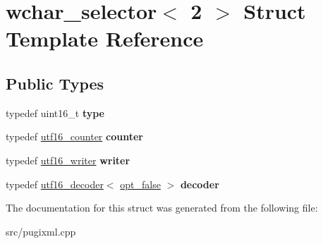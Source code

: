 \hypertarget{structwchar__selector_3_012_01_4}{}\section{wchar\+\_\+selector$<$ 2 $>$ Struct Template Reference}
\label{structwchar__selector_3_012_01_4}
\subsection*{Public Types}
\begin{DoxyCompactItemize}
\item 
\mbox{\label{structwchar__selector_3_012_01_4_a60517f9b159ad60977ca7c3d2739c168}} 
typedef uint16\+\_\+t {\bfseries type}
\item 
\mbox{\label{structwchar__selector_3_012_01_4_a108682c81b16127f3bec2501f02cb9d8}} 
typedef \hyperlink{structutf16__counter}{utf16\+\_\+counter} {\bfseries counter}
\item 
\mbox{\label{structwchar__selector_3_012_01_4_af84979f9b8cd883798fe4e99820d6073}} 
typedef \hyperlink{structutf16__writer}{utf16\+\_\+writer} {\bfseries writer}
\item 
\mbox{\label{structwchar__selector_3_012_01_4_a74001138c16e29a1892b903b8778760b}} 
typedef \hyperlink{structutf16__decoder}{utf16\+\_\+decoder}$<$ \hyperlink{structopt__false}{opt\+\_\+false} $>$ {\bfseries decoder}
\end{DoxyCompactItemize}


The documentation for this struct was generated from the following file\+:\begin{DoxyCompactItemize}
\item 
src/pugixml.\+cpp\end{DoxyCompactItemize}
